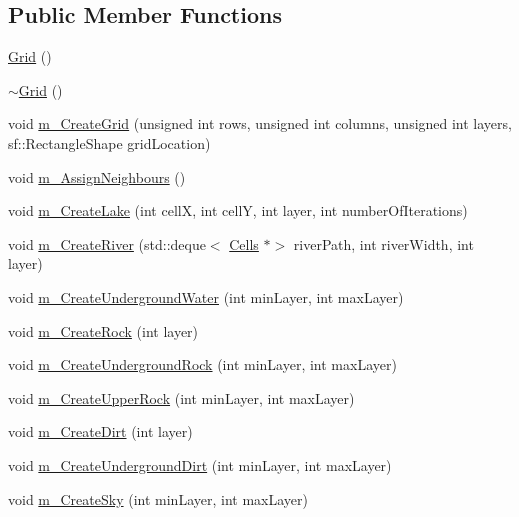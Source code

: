 \subsection*{Public Member Functions}
\begin{DoxyCompactItemize}
\item 
\mbox{\hyperlink{class_grid_a4ac9ff4f63552b4c61ff90fcb35ad66c}{Grid}} ()
\item 
\mbox{\hyperlink{class_grid_a3661d0a7f998caaaf8627d7a67072116}{$\sim$\+Grid}} ()
\item 
void \mbox{\hyperlink{class_grid_a0868e8a5ebf55a8746637300bc7aa68b}{m\+\_\+\+Create\+Grid}} (unsigned int rows, unsigned int columns, unsigned int layers, sf\+::\+Rectangle\+Shape grid\+Location)
\item 
void \mbox{\hyperlink{class_grid_a0aa6c9b7aa63b06925be47ef0eeda314}{m\+\_\+\+Assign\+Neighbours}} ()
\item 
void \mbox{\hyperlink{class_grid_ac97a49844ee993f6afe89ae1518e5f44}{m\+\_\+\+Create\+Lake}} (int cellX, int cellY, int layer, int number\+Of\+Iterations)
\item 
void \mbox{\hyperlink{class_grid_a5e87248bee8835c61b1977407f5ef034}{m\+\_\+\+Create\+River}} (std\+::deque$<$ \mbox{\hyperlink{class_cells}{Cells}} $\ast$$>$ river\+Path, int river\+Width, int layer)
\item 
void \mbox{\hyperlink{class_grid_a32c88ba0de0530b6d4c1b0ab2cde31dc}{m\+\_\+\+Create\+Underground\+Water}} (int min\+Layer, int max\+Layer)
\item 
void \mbox{\hyperlink{class_grid_a8d5e70ea3e0fac523d409882b4c3949c}{m\+\_\+\+Create\+Rock}} (int layer)
\item 
void \mbox{\hyperlink{class_grid_a5b15f505b7508caeb457c0b218482164}{m\+\_\+\+Create\+Underground\+Rock}} (int min\+Layer, int max\+Layer)
\item 
void \mbox{\hyperlink{class_grid_a121458c828be458c452e5f6c80c07cc9}{m\+\_\+\+Create\+Upper\+Rock}} (int min\+Layer, int max\+Layer)
\item 
void \mbox{\hyperlink{class_grid_aa0ee683a771225bfdbe07ecd6c4341fb}{m\+\_\+\+Create\+Dirt}} (int layer)
\item 
void \mbox{\hyperlink{class_grid_a315b11046448a05d48d949eb296b593f}{m\+\_\+\+Create\+Underground\+Dirt}} (int min\+Layer, int max\+Layer)
\item 
void \mbox{\hyperlink{class_grid_a66df10e620798fde6b1455d9d49bc60c}{m\+\_\+\+Create\+Sky}} (int min\+Layer, int max\+Layer)
\item 
$$
\end{DoxyCompactItemize}
